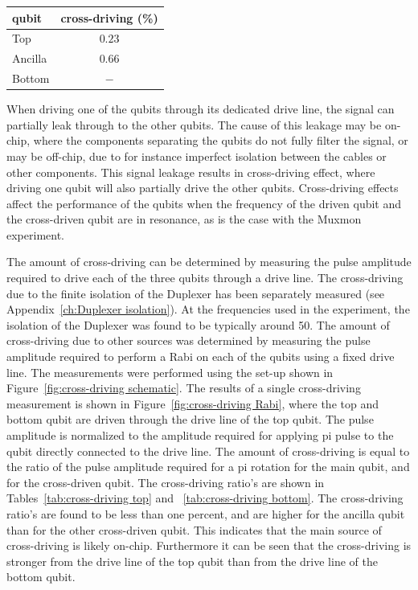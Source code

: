 {\begin{minipage}{0.35\textwidth}
          \vspace{2cm}
          \begin{tabular}{l c}
            \toprule
            qubit & cross-driving (\%) \\
            \midrule
            Top & $0.23$ \\
            Ancilla &$ 0.66$ \\
            Bottom & $-$ \\
            \bottomrule
          \end{tabular}
          \label{tab:cross-driving bottom}
        \end{minipage}
      \vspace{1cm}
      }

      When driving one of the qubits through its dedicated drive line, the signal can partially leak through to the other qubits. The cause of this leakage may be on-chip, where the components separating the qubits do not fully filter the signal, or may be off-chip, due to for instance imperfect isolation between the cables or other components. This signal leakage results in cross-driving effect, where driving one qubit will also partially drive the other qubits. Cross-driving effects affect the performance of the qubits when the frequency of the driven qubit and the cross-driven qubit are in resonance, as is the case with the Muxmon experiment.

      The amount of cross-driving can be determined by measuring the pulse amplitude required to drive each of the three qubits through a drive line. The cross-driving due to the finite isolation of the Duplexer has been separately measured (see Appendix~\ref{ch:Duplexer isolation}). At the frequencies used in the experiment, the isolation of the Duplexer was found to be typically around \SI{50}{\dBm}. The amount of cross-driving due to other sources was determined by measuring the pulse amplitude required to perform a Rabi on each of the qubits using a fixed drive line. The measurements were performed using the set-up shown in Figure~\ref{fig:cross-driving schematic}. The results of a single cross-driving measurement is shown in Figure~\ref{fig:cross-driving Rabi}, where the top and bottom qubit are driven through the drive line of the top qubit. The pulse amplitude is normalized to the amplitude required for applying pi pulse to the qubit directly connected to the drive line. The amount of cross-driving is equal to the ratio of the pulse amplitude required for a pi rotation for the main qubit, and for the cross-driven qubit. The cross-driving ratio's are shown in Tables~\ref{tab:cross-driving top} and ~\ref{tab:cross-driving bottom}. The cross-driving ratio's are found to be less than one percent, and are higher for the ancilla qubit than for the other cross-driven qubit. This indicates that the main source of cross-driving is likely on-chip. Furthermore it can be seen that the cross-driving is stronger from the drive line of the top qubit than from the drive line of the bottom qubit.

